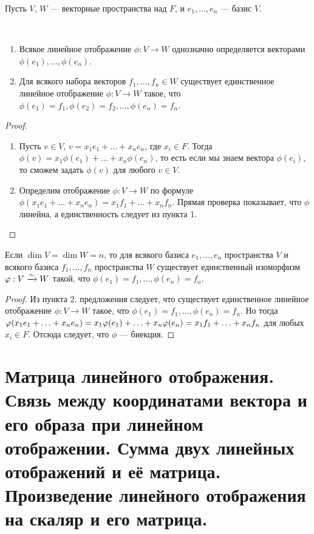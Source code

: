 Пусть $V$, $W$ --- векторные пространства над $F$, и $e_1, \ldots, e_n$ --- базис $V$.
\begin{Suggestion} \ 
\begin{enumerate}
\item Всякое линейное отображение $\phi : V \rightarrow W$ однозначно определяется векторами $\phi(e_1), \ldots, \phi(e_n)$.
\item Для всякого набора векторов $f_1, \ldots, f_n \in W$ существует единственное линейное отображение $\phi: V \rightarrow W$ такое, что $\phi(e_1) = f_1, \phi(e_2) = f_2, \ldots, \phi(e_n) = f_n$.
\end{enumerate}
\end{Suggestion}
\begin{proof} \ 
\begin{enumerate}
\item Пусть $v \in V$, $v = x_1 e_1 + \ldots + x_ne_n$, где $x_i \in F$. Тогда $\phi(v) = x_1\phi(e_1) + \ldots + x_n \phi(e_n)$, то есть если мы знаем  вектора $\phi(e_i)$, то сможем задать $\phi(v)$ для любого $v \in V$.
\item Определим отображение $\phi: V \rightarrow W$ по формуле $\phi(x_1 e_1 + \ldots + x_n e_n) = x_1f_1 + \ldots + x_nf_n$. Прямая проверка показывает, что $\phi$ линейна, а единственность следует из пункта 1.
\end{enumerate}
\end{proof}

\begin{Consequence}
Если $\dim V = \dim W = n$, то для всякого базиса $e_1, \ldots, e_n$ пространства $V$ и всякого базиса $f_1, \ldots , f_n$ пространства $W$ существует единственный изоморфизм $\varphi: V \xrightarrow{\sim} W$ такой, что $\phi(e_1) = f_1, \ldots, \phi(e_n) = f_n$.
\end{Consequence}
\begin{proof}
Из пункта 2. предложения следует, что существует единственное линейное отображение $\phi: V \rightarrow W$ такое, что $\phi(e_1) = f_1, \ldots, \phi(e_n) = f_n$. Но тогда $\phi(x_1e_1 + \ldots + x_ne_n) \hm= x_1\phi(e_1) + \ldots + x_n\phi(e_n) = x_1f_1 + \ldots + x_nf_n$ для любых $x_i \in F$. Отсюда следует, что $\phi$ --- биекция. 
\end{proof}

\section{Матрица линейного отображения. Связь между координатами вектора и его образа при линейном отображении. Сумма двух линейных отображений и её матрица. Произведение линейного отображения на скаляр и его матрица.}

